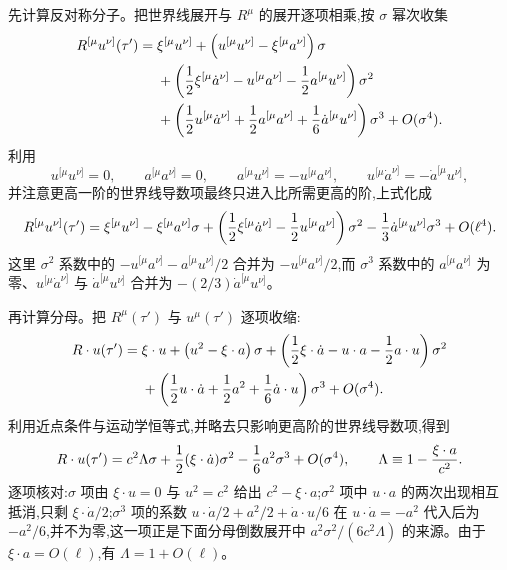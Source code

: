 先计算反对称分子。把世界线展开与 $R^\mu$ 的展开逐项相乘,按 $\sigma$ 幂次收集
\begin{align*}
 R^{[\mu}u^{\nu]}(\tau')={}&\xi^{[\mu}u^{\nu]}
 +\left(u^{[\mu}u^{\nu]}-\xi^{[\mu}a^{\nu]}\right)\sigma\\
 &+\left({1\over2}\xi^{[\mu}\dot a^{\nu]}
 -u^{[\mu}a^{\nu]}
 -{1\over2}a^{[\mu}u^{\nu]}\right)\sigma^2\\
 &+\left({1\over2}u^{[\mu}\dot a^{\nu]}
 +{1\over2}a^{[\mu}a^{\nu]}
 +{1\over6}\dot a^{[\mu}u^{\nu]}\right)\sigma^3
 +O(\sigma^4).
\end{align*}
利用
\begin{equation*}
 u^{[\mu}u^{\nu]}=0,
 \qquad
 a^{[\mu}a^{\nu]}=0,
 \qquad
 a^{[\mu}u^{\nu]}=-u^{[\mu}a^{\nu]},
 \qquad
 u^{[\mu}\dot a^{\nu]}=-\dot a^{[\mu}u^{\nu]},
\end{equation*}
并注意更高一阶的世界线导数项最终只进入比所需更高的阶,上式化成
\begin{equation*}
 R^{[\mu}u^{\nu]}(\tau')
 =\xi^{[\mu}u^{\nu]}
 -\xi^{[\mu}a^{\nu]}\sigma
 +\left({1\over2}\xi^{[\mu}\dot a^{\nu]}
 -{1\over2}u^{[\mu}a^{\nu]}\right)\sigma^2
 -{1\over3}\dot a^{[\mu}u^{\nu]}\sigma^3
 +O(\ell^4).
\end{equation*}
这里 $\sigma^2$ 系数中的 $-u^{[\mu}a^{\nu]}-a^{[\mu}u^{\nu]}/2$ 合并为 $-u^{[\mu}a^{\nu]}/2$,而 $\sigma^3$ 系数中的 $a^{[\mu}a^{\nu]}$ 为零、$u^{[\mu}\dot a^{\nu]}$ 与 $\dot a^{[\mu}u^{\nu]}$ 合并为 $-(2/3)\dot a^{[\mu}u^{\nu]}$。

再计算分母。把 $R^\mu(\tau')$ 与 $u^\mu(\tau')$ 逐项收缩:
\begin{align*}
 R\cdot u(\tau')={}&\xi\cdot u
 +\left(u^2-\xi\cdot a\right)\sigma
 +\left({1\over2}\xi\cdot\dot a
 -u\cdot a
 -{1\over2}a\cdot u\right)\sigma^2\\
 &+\left({1\over2}u\cdot\dot a
 +{1\over2}a^2
 +{1\over6}\dot a\cdot u\right)\sigma^3
 +O(\sigma^4).
\end{align*}
利用近点条件与运动学恒等式,并略去只影响更高阶的世界线导数项,得到
\begin{equation*}
 R\cdot u(\tau')
 =c^2\Lambda\sigma
 +{1\over2}(\xi\cdot\dot a)\sigma^2
 -{1\over6}a^2\sigma^3
 +O(\sigma^4),
 \qquad
 \Lambda\equiv1-{\xi\cdot a\over c^2}.
\end{equation*}
逐项核对:$\sigma$ 项由 $\xi\cdot u=0$ 与 $u^2=c^2$ 给出 $c^2-\xi\cdot a$;$\sigma^2$ 项中 $u\cdot a$ 的两次出现相互抵消,只剩 $\xi\cdot\dot a/2$;$\sigma^3$ 项的系数 $u\cdot\dot a/2+a^2/2+\dot a\cdot u/6$ 在 $u\cdot\dot a=-a^2$ 代入后为 $-a^2/6$,并不为零,这一项正是下面分母倒数展开中 $a^2\sigma^2/(6c^2\Lambda)$ 的来源。由于 $\xi\cdot a=O(\ell)$,有 $\Lambda=1+O(\ell)$。

